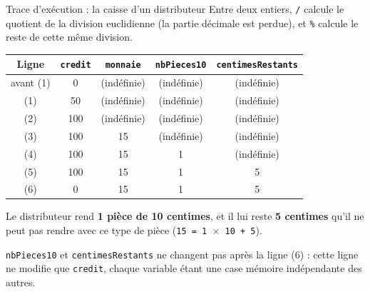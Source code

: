 \begin{UPSTIprofOnlyEnv}
    \begin{UPSTIcorrectionP}{Trace d'exécution : la caisse d'un distributeur}
        Entre deux entiers, \texttt{/} calcule le quotient de la division euclidienne (la partie décimale est perdue), et \texttt{\%} calcule le reste de cette même division.

        \begin{center}
            \begin{tabular}{|c|c|c|c|c|}
                \hline
                \textbf{Ligne} & \texttt{credit} & \texttt{monnaie}  & \texttt{nbPieces10} & \texttt{centimesRestants} \\
                \hline
                avant (1)      & 0               & (indéfinie)       & (indéfinie)         & (indéfinie)               \\
                \hline
                (1)            & 50              & (indéfinie)       & (indéfinie)         & (indéfinie)               \\
                \hline
                (2)            & 100             & (indéfinie)       & (indéfinie)         & (indéfinie)               \\
                \hline
                (3)            & 100             & 15                & (indéfinie)         & (indéfinie)               \\
                \hline
                (4)            & 100             & 15                & 1                   & (indéfinie)               \\
                \hline
                (5)            & 100             & 15                & 1                   & 5                         \\
                \hline
                (6)            & 0               & 15                & 1                   & 5                         \\
                \hline
            \end{tabular}
        \end{center}
        Le distributeur rend \textbf{1 pièce de 10 centimes}, et il lui reste \textbf{5 centimes} qu'il ne peut pas rendre avec ce type de pièce (\texttt{15 = 1 $\times$ 10 + 5}).

        \texttt{nbPieces10} et \texttt{centimesRestants} ne changent pas après la ligne (6) : cette ligne ne modifie que \texttt{credit}, chaque variable étant une case mémoire indépendante des autres.
    \end{UPSTIcorrectionP}
\end{UPSTIprofOnlyEnv}



